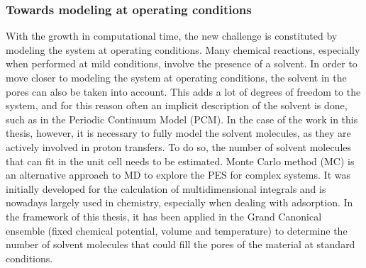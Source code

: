 \subsubsection{Towards modeling at operating conditions}
With the growth in computational time, the new challenge is constituted by modeling the system at operating conditions. Many chemical reactions, especially when performed at mild conditions, involve the presence of a solvent. In order to move closer to modeling the system at operating conditions, the solvent in the pores can also be taken into account. This adds a lot of degrees of freedom to the system, and for this reason often an implicit description of the solvent is done, such as in the Periodic Continuum Model (PCM)\cite{cances1997new}. In the case of the work in this thesis, however, it is necessary to fully model the solvent molecules, as they are actively involved in proton transfers. To do so, the number of solvent molecules that can fit in the unit cell needs to be estimated. Monte Carlo method (MC) is an alternative approach to MD to explore the PES for complex systems. It was initially developed for the calculation of multidimensional integrals and is nowadays largely used in chemistry, especially when dealing with adsorption. In the framework of this thesis, it has been applied in the Grand Canonical ensemble (fixed chemical potential, volume and temperature) to determine the number of solvent molecules that could fill the pores of the material at standard conditions.

